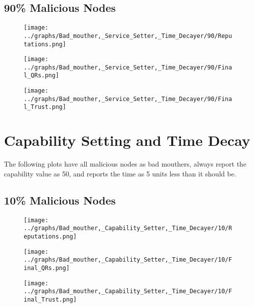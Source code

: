\documentclass{article}
\begin{document}
    \begin{minipage}[t]{0.49\columnwidth}
    \subsection*{90\% Malicious Nodes}
        \begin{figure}[H]
            \centering
            \texttt{[image: ../graphs/Bad\_mouther,\_Service\_Setter,\_Time\_Decayer/90/Reputations.png]}
        \end{figure}
        \begin{figure}[H]
            \centering
            \texttt{[image: ../graphs/Bad\_mouther,\_Service\_Setter,\_Time\_Decayer/90/Final\_QRs.png]}
        \end{figure}
    \end{minipage}
    \begin{minipage}[t]{0.49\columnwidth}
        \begin{figure}[H]
            \centering
            \texttt{[image: ../graphs/Bad\_mouther,\_Service\_Setter,\_Time\_Decayer/90/Final\_Trust.png]}
        \end{figure}
    \end{minipage}
    \newpage

    \section*{Capability Setting and Time Decay}
    The following plots have all malicious nodes as bad mouthers, always
    report the capability value as 50, and reports the time as 5 units less than
    it should be.
    \\
  \begin{minipage}[t]{0.49\columnwidth}
    \subsection*{10\% Malicious Nodes}
        \begin{figure}[H]
            \centering
            \texttt{[image: ../graphs/Bad\_mouther,\_Capability\_Setter,\_Time\_Decayer/10/Reputations.png]}
        \end{figure}
        \begin{figure}[H]
            \centering
            \texttt{[image: ../graphs/Bad\_mouther,\_Capability\_Setter,\_Time\_Decayer/10/Final\_QRs.png]}
        \end{figure}
    \end{minipage}
    \begin{minipage}[t]{0.49\columnwidth}
        \begin{figure}[H]
            \centering
            \texttt{[image: ../graphs/Bad\_mouther,\_Capability\_Setter,\_Time\_Decayer/10/Final\_Trust.png]}
        \end{figure}
    \end{minipage}
\end{document}
